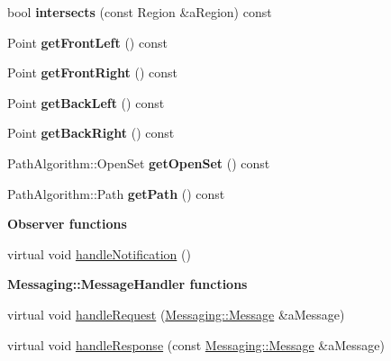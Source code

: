 \begin{DoxyCompactItemize}
\item 
bool {\bfseries intersects} (const Region \&a\+Region) const \hypertarget{class_model_1_1_robot_ae33fd5aaf09cdb89e4d02b4a138ed3b0}{}\label{class_model_1_1_robot_ae33fd5aaf09cdb89e4d02b4a138ed3b0}

\item 
Point {\bfseries get\+Front\+Left} () const \hypertarget{class_model_1_1_robot_ad04268210b4531df65b17dfe425173e9}{}\label{class_model_1_1_robot_ad04268210b4531df65b17dfe425173e9}

\item 
Point {\bfseries get\+Front\+Right} () const \hypertarget{class_model_1_1_robot_adb945c72992d0fcb78dca5a9e8513e1b}{}\label{class_model_1_1_robot_adb945c72992d0fcb78dca5a9e8513e1b}

\item 
Point {\bfseries get\+Back\+Left} () const \hypertarget{class_model_1_1_robot_a2757b46172e01b641ccf6f1e7783ca4d}{}\label{class_model_1_1_robot_a2757b46172e01b641ccf6f1e7783ca4d}

\item 
Point {\bfseries get\+Back\+Right} () const \hypertarget{class_model_1_1_robot_a4761dc0e97ce402c9010ba25737f33ad}{}\label{class_model_1_1_robot_a4761dc0e97ce402c9010ba25737f33ad}

\item 
Path\+Algorithm\+::\+Open\+Set {\bfseries get\+Open\+Set} () const \hypertarget{class_model_1_1_robot_accc03064c9ae17be090629566e2b5075}{}\label{class_model_1_1_robot_accc03064c9ae17be090629566e2b5075}

\item 
Path\+Algorithm\+::\+Path {\bfseries get\+Path} () const \hypertarget{class_model_1_1_robot_a8913b96ae0804e35138ad7c9858bcb0c}{}\label{class_model_1_1_robot_a8913b96ae0804e35138ad7c9858bcb0c}

\end{DoxyCompactItemize}
\begin{Indent}{\bf Observer functions}\par
\begin{DoxyCompactItemize}
\item 
virtual void \hyperlink{class_model_1_1_robot_a7629555402fa8b55658d52fdc88ab889}{handle\+Notification} ()
\end{DoxyCompactItemize}
\end{Indent}
\begin{Indent}{\bf Messaging\+:\+:Message\+Handler functions}\par
\begin{DoxyCompactItemize}
\item 
virtual void \hyperlink{class_model_1_1_robot_a5b52eb37c4e11850c3f60263599bd79c}{handle\+Request} (\hyperlink{struct_messaging_1_1_message}{Messaging\+::\+Message} \&a\+Message)
\item 
virtual void \hyperlink{class_model_1_1_robot_afa5fb42fca43fdfedb08d3a7cb38c037}{handle\+Response} (const \hyperlink{struct_messaging_1_1_message}{Messaging\+::\+Message} \&a\+Message)
\end{DoxyCompactItemize}
\end{Indent}
